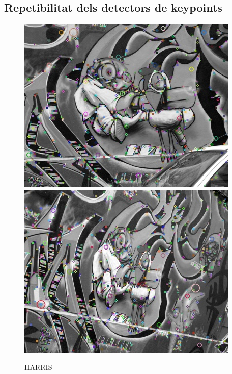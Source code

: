 \subsection{Repetibilitat dels detectors de keypoints}
		\begin{figure}[!htb]
				\includegraphics[width=\linewidth]{images/experiments/KP_HARRIS_0}
				\label{fig:awesome_image1}
			\endminipage\hfill
				\includegraphics[width=\linewidth]{images/experiments/KP_HARRIS_1}
				\label{fig:awesome_image2}
			\endminipage
			\caption{HARRIS}
		\end{figure}
